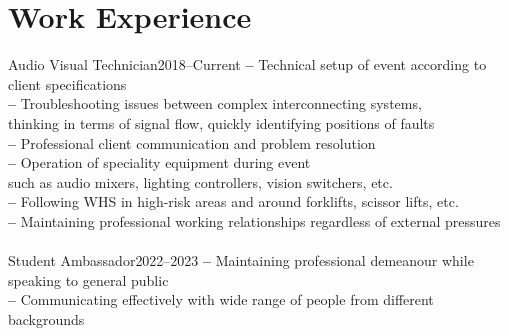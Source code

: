 \section{Work Experience}
    {Audio Visual Technician}{2018--Current}{
      \textbf{--} Technical setup of event according to client specifications \\
      \textbf{--} Troubleshooting issues between complex interconnecting systems, \\
        \hspace{18pt} thinking in terms of signal flow, quickly identifying positions of faults \\
      \textbf{--} Professional client communication and problem resolution \\
      \textbf{--} Operation of speciality equipment during event \\
        \hspace{18pt} such as audio mixers, lighting controllers, vision switchers, etc. \\
      \textbf{--} Following WHS in high-risk areas and around forklifts, scissor lifts, etc. \\
      \textbf{--} Maintaining professional working relationships regardless of external pressures \\
    }
\\
    {Student Ambassador}{2022--2023}{
      \textbf{--} Maintaining professional demeanour while speaking to general public \\
      \textbf{--} Communicating effectively with wide range of people from different backgrounds \\
    }
